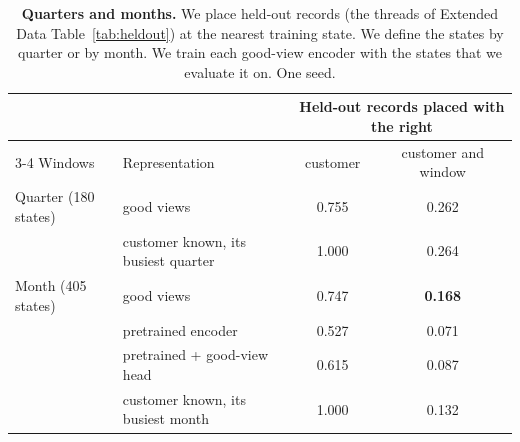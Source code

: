 \documentclass[11pt]{article}
\begin{document}
\begin{table}[h]
\centering
\small
\caption{\textbf{Quarters and months.} We place held-out records (the threads of Extended Data Table~\ref{tab:heldout}) at the nearest training state. We define the states by quarter or by month. We train each good-view encoder with the states that we evaluate it on. One seed.}
\label{tab:months}
\setlength{\tabcolsep}{5pt}\begin{tabular}{llcc}
\toprule
& & \multicolumn{2}{c}{Held-out records placed with the right} \\
\cmidrule(lr){3-4}
Windows & Representation & customer & customer and window \\
\midrule
Quarter (180 states) & good views & 0.755 & 0.262 \\
 & customer known, its busiest quarter & 1.000 & 0.264 \\
\addlinespace[2pt]
Month (405 states) & good views & 0.747 & \textbf{0.168} \\
 & pretrained encoder & 0.527 & 0.071 \\
 & pretrained + good-view head & 0.615 & 0.087 \\
 & customer known, its busiest month & 1.000 & 0.132 \\
\bottomrule
\end{tabular}
\end{table}
\end{document}
